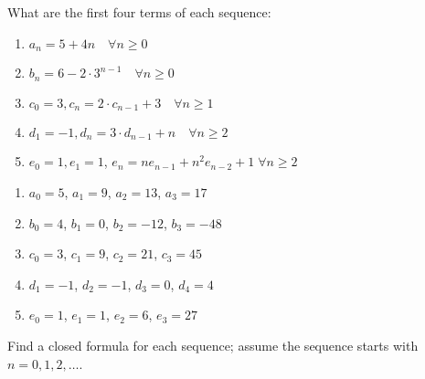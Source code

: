 \begin{questions}
 What are the first four terms of each sequence: 

\begin{minipage}{0.5\textwidth}
\begin{enumerate}[label=(\alph*),itemsep=0pt,parsep=0pt,topsep=0pt]
  \item $a_n = 5 + 4n \quad \forall n \geq 0$ \hspace{0.25in} 
  \item $b_n = 6 - 2\cdot3^{n-1} \quad \forall n \geq 0$ 
  \item $c_0 = 3, c_n = 2\cdot c_{n-1} + 3 \quad \forall n \geq 1$ 
  \item $d_1 = -1, d_n = 3\cdot d_{n-1} + n \quad \forall n \geq 2$ 
  \item $e_0 = 1, e_1 = 1$, $e_n = ne_{n-1} + n^2e_{n-2} + 1\;\forall n \geq 2$
\end{enumerate}
\end{minipage}
% 
\begin{minipage}{0.5\textwidth}
\begin{solution}
\begin{enumerate}[label=(\alph*),itemsep=0pt,parsep=0pt,topsep=0pt]
  \item $a_0 = 5$, $a_1 = 9$, $a_2 = 13$, $a_3 = 17$
  \item $b_0 = 4$, $b_1 = 0$, $b_2 = -12$, $b_3 = -48$
  \item $c_0 = 3$, $c_1 = 9$, $c_2 = 21$, $c_3 = 45$
  \item $d_1 = -1$, $d_2 = -1$, $d_3 = 0$, $d_4 = 4$ 
  \item $e_0 = 1$, $e_1 = 1$, $e_2 = 6$, $e_3 = 27$
\end{enumerate}
\end{solution}
\end{minipage}





 Find a closed formula for each sequence; assume the sequence starts with $n=0, 1, 2, \ldots$. 


\end{questions}

